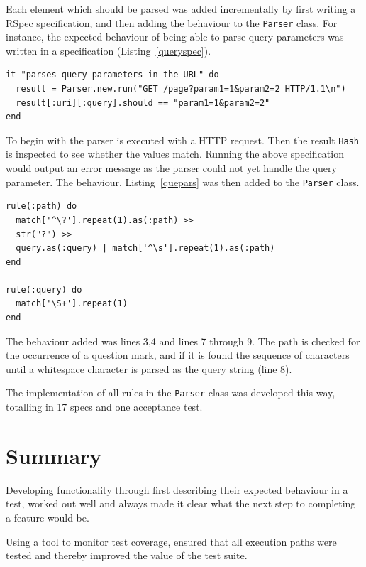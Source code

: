 Each element which should be parsed was added incrementally by first writing a
RSpec specification, and then adding the behaviour to the \texttt{Parser}
class. For instance, the expected behaviour of being able to parse query
parameters was written in a specification (Listing~\ref{queryspec}).

\bigskip
\begin{lstlisting}[label=queryspec,caption=Parser query parameter support specification (spec/yarn/parser\_spec.rb:54).]
it "parses query parameters in the URL" do
  result = Parser.new.run("GET /page?param1=1&param2=2 HTTP/1.1\n")
  result[:uri][:query].should == "param1=1&param2=2"
end
\end{lstlisting}

To begin with the parser is executed with a HTTP request. Then the result
\texttt{Hash} is inspected to see whether the values match. Running the above
specification would output an error message as the parser could not yet
handle the query parameter. The behaviour, Listing~\ref{quepars} was then
added to the \texttt{Parser} class.

\bigskip
\begin{lstlisting}[label=quepars,caption=URL query parameter support (lib/yarn/parser.rb:31).]
rule(:path) do 
  match['^\?'].repeat(1).as(:path) >> 
  str("?") >> 
  query.as(:query) | match['^\s'].repeat(1).as(:path)
end

rule(:query) do
  match['\S+'].repeat(1)
end
\end{lstlisting}

The behaviour added was lines 3,4 and lines 7 through 9. The path is checked
for the occurrence of a question mark, and if it is found the sequence of
characters until a whitespace character is parsed as the query string (line 8).

The implementation of all rules in the \texttt{Parser} class was developed
this way, totalling in 17 specs and one acceptance test.


\section{Summary}
Developing functionality through first describing their expected behaviour in a
test, worked out well and always made it clear what the next step to
completing a feature would be. 

Using a tool to monitor test coverage, ensured that all execution paths were
tested and thereby improved the value of the test suite.
